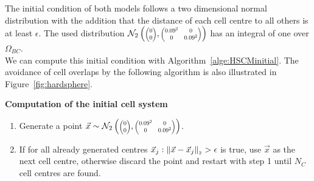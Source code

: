 The initial condition of both models follows a two dimensional normal distribution with the addition that the distance of each cell centre to all others is at least $\epsilon$.  
The used distribution $\mathcal{N}_2 \left( 
\scalebox{0.7}{$\begin{pmatrix} 0 \\ 0 \end{pmatrix}$}, 
\scalebox{0.7}{$\begin{pmatrix} 0.09^2 & 0 \\ 0 & 0.09^2 \end{pmatrix}$}
\right)$ has an integral of one over $\Omega_{BC}$. \\
We can compute this initial condition with Algorithm~\ref{alge:HSCMinitial}. 
The avoidance of cell overlaps by the following algorithm is also illustrated in Figure~\ref{fig:hardsphere}. 
\begin{algorithm} \textbf{Computation of the initial cell system} \label{alge:HSCMinitial}
	\begin{enumerate} 
		\item Generate a point $\vec{x} \sim \mathcal{N}_2 \left( 
        \scalebox{0.7}{$\begin{pmatrix} 0 \\ 0 \end{pmatrix}$}, 
        \scalebox{0.7}{$\begin{pmatrix} 0.09^2 & 0 \\ 0 & 0.09^2 \end{pmatrix}$}
        \right)$. 
		\item If for all already generated centres $\vec{x}_j: \norm[\vec{x} - \vec{x}_j] > \epsilon$ is true, use $\vec{x}$ as the next cell centre, otherwise discard the point and restart with step 1 until $N_{C}$ cell centres are found. 
	\end{enumerate}	
\end{algorithm}



